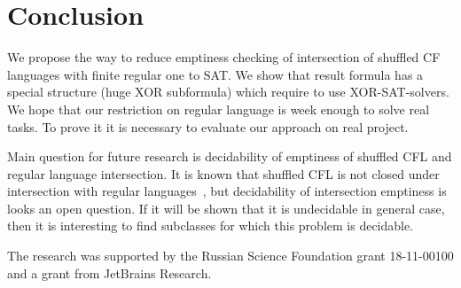 

\section{Conclusion}

We propose the way to reduce emptiness checking of intersection of shuffled CF languages with finite regular one to SAT.
We show that result formula has a special structure (huge XOR subformula) which require to use XOR-SAT-solvers.
We hope that our restriction on regular language is week enough to solve real tasks.
To prove it it is necessary to evaluate our approach on real project.

Main question for future research is decidability of emptiness of shuffled CFL and regular language intersection.
It is known that shuffled CFL is not closed under intersection with regular languages~\cite{CFLShuffle}, but decidability of intersection emptiness is looks an open question.
If it will be shown that it is undecidable in general case, then it is interesting to find subclasses for which this problem is decidable.



\begin{acks}
The research was supported by the Russian Science Foundation grant 18-11-00100 and a grant from JetBrains Research.   
\end{acks}
